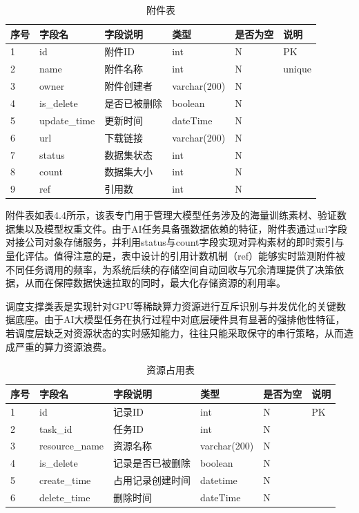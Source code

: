 \begin{table}[htbp]
    \centering
    \caption{附件表}
    \begin{tabular}{llllll}
        \toprule
        序号 & 字段名 & 字段说明 & 类型 & 是否为空 & 说明 \\
        \midrule
1 & id & 附件ID & int & N & PK \\
2 & name & 附件名称 & int & N & unique \\
3 & owner & 附件创建者 & varchar(200) & N &  \\
4 & is\_delete & 是否已被删除 & boolean & N &  \\
5 & update\_time & 更新时间 & dateTime & N &  \\
6 & url & 下载链接 & varchar(200) & N &  \\
7 & status & 数据集状态 & int & N &  \\
8 & count & 数据集大小 & int & N &  \\
9 & ref & 引用数 & int & N &  \\
        \bottomrule
    \end{tabular}
    \label{tab:my_label}
\end{table}

附件表如表4.4所示，该表专门用于管理大模型任务涉及的海量训练素材、验证数据集以及模型权重文件。由于AI任务具备强数据依赖的特征，附件表通过url字段对接公司对象存储服务，并利用status与count字段实现对异构素材的即时索引与量化评估。值得注意的是，表中设计的引用计数机制（ref）能够实时监测附件被不同任务调用的频率，为系统后续的存储空间自动回收与冗余清理提供了决策依据，从而在保障数据快速拉取的同时，最大化存储资源的利用率。

调度支撑类表是实现针对GPU等稀缺算力资源进行互斥识别与并发优化的关键数据底座。由于AI大模型任务在执行过程中对底层硬件具有显著的强排他性特征，若调度层缺乏对资源状态的实时感知能力，往往只能采取保守的串行策略，从而造成严重的算力资源浪费。

\begin{table}[htbp]
    \centering
    \caption{资源占用表}
    \begin{tabular}{llllll}
        \toprule
        序号 & 字段名 & 字段说明 & 类型 & 是否为空 & 说明 \\
        \midrule
1 & id & 记录ID & int & N & PK \\
2 & task\_id & 任务ID & int & N &  \\
3 & resource\_name & 资源名称 & varchar(200) & N &  \\
4 & is\_delete & 记录是否已被删除 & boolean & N &  \\
5 & create\_time & 占用记录创建时间 & datetime & N &  \\
6 & delete\_time & 删除时间 & dateTime & N &  \\
        \bottomrule
    \end{tabular}
    \label{tab:my_label}
\end{table}

